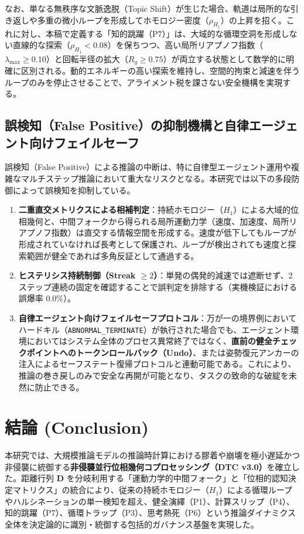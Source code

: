 \documentclass[11pt,a4paper]{article}
\begin{document}
なお、単なる無秩序な文脈逸脱（Topic Shift）が生じた場合、軌道は局所的な引き返しや多重の微小ループを形成してホモロジー密度（$\rho_{H_1}$）の上昇を招く。これに対し、本稿で定義する「知的跳躍（P7）」は、大域的な循環空洞を形成しない直線的な探索（$\rho_{H_1} < 0.08$）を保ちつつ、高い局所リアプノフ指数（$\lambda_{\max} \ge 0.10$）と回転半径の拡大（$R_g \ge 0.75$）が両立する状態として数学的に明確に区別される。動的エネルギーの高い探索を維持し、空間的拘束と減速を伴うループのみを停止させることで、アライメント税を課さない安全機構を実現する。

\subsection{誤検知（False Positive）の抑制機構と自律エージェント向けフェイルセーフ}

誤検知（False Positive）による推論の中断は、特に自律型エージェント運用や複雑なマルチステップ推論において重大なリスクとなる。本研究では以下の多段防御によって誤検知を抑制している。
\begin{enumerate}
    \item \textbf{二重直交メトリクスによる相補判定}：持続ホモロジー（$H_1$）による大域的位相幾何と、中間フォークから得られる局所運動力学（速度、加速度、局所リアプノフ指数）は直交する情報空間を形成する。速度が低下してもループが形成されていなければ長考として保護され、ループが検出されても速度と探索範囲が健全であれば多角反証として通過する。
    \item \textbf{ヒステリシス持続制御（Streak $\ge 2$）}：単発の偶発的減速では遮断せず、2ステップ連続の固定を確認することで誤判定を排除する（実機検証における誤爆率 0.0\%）。
    \item \textbf{自律エージェント向けフェイルセーフプロトコル}：万が一の境界例においてハードキル（\texttt{ABNORMAL\_TERMINATE}）が執行された場合でも、エージェント環境においてはシステム全体のプロセス異常終了ではなく、\textbf{直前の健全チェックポイントへのトークンロールバック（Undo）}、または姿勢復元アンカーの注入によるセーフステート復帰プロトコルと連動可能である。これにより、推論の巻き戻しのみで安全な再開が可能となり、タスクの致命的な破綻を未然に防止できる。
\end{enumerate}

\section{結論 (Conclusion)}

本研究では、大規模推論モデルの推論時計算における膠着や崩壊を極小遅延かつ非侵襲に統御する\textbf{非侵襲並行位相幾何コプロセッシング（DTC v3.0）}を確立した。距離行列 $\mathbf{D}$ を分岐利用する「運動力学的中間フォーク」と「位相的認知決定マトリクス」の統合により、従来の持続ホモロジー（$H_1$）による循環ループやハルシネーションの単一検知を超え、健全演繹（P1）、計算スリップ（P4）、知的跳躍（P7）、循環トラップ（P3）、思考熱死（P6）という推論ダイナミクス全体を決定論的に識別・統御する包括的ガバナンス基盤を実現した。
\end{document}
